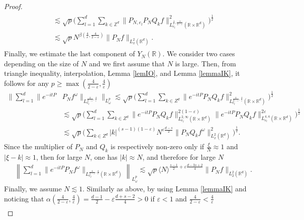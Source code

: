 \documentclass[10pt,leqno]{amsart}
\newcommand{\R}{\mathbb{R}}
\numberwithin{equation}{section}
\newcommand{\Z}{\mathbb{Z}}
\begin{document}
\begin{proof}
\begin{multline*}
\begin{aligned}
 &\lesssim \sqrt{p} \bigg( \sum_{l = 1}^d \sum_{k \in \Z^d} \|P_{N,e_l} P_N Q_k f \|^2_{L^{\frac{4}{\varepsilon},\frac{4}{2-\varepsilon}}_{e_l} (\R\times \R^d)} \bigg)^{\frac{1}{2}} \\
& \lesssim \sqrt{p}N^{\beta (\frac{4}{\varepsilon},\frac{4}{2-\varepsilon})} \|P_N f\|_{L_x^2 (\R^d )}.
\end{aligned}
\end{multline*}
Finally, we estimate the last component of $Y_N (\R)$. We consider two cases depending on the size of $N$ and we first  assume that $N$ is large. Then,
from triangle inequality, interpolation,  Lemma \ref{lemIO}, and Lemma \ref{lemmaIK}, it follows for any $p \geq \max (\frac{4}{2-\varepsilon},\frac{4}{\varepsilon})$
\begin{align*}
\bigg\|\sum_{l=1}^d\|e^{-it P}  &P_N f^\omega \|_{ L^{\frac{4}{2-\varepsilon},\frac{4}{\varepsilon}}_{e_l} } \bigg\|_{L^p_\omega}
\lesssim \sqrt{p} \bigg(\sum_{l=1}^d \sum_{k \in Z^d} \| e^{-it P}  P_N Q_k f \|^2_{L^{\frac{4}{2-\varepsilon},\frac{4}{\varepsilon}}_{e_l} (\R\times \R^d)}\bigg)^{\frac{1}{2}}\\
&\lesssim  \sqrt{p} \bigg(\sum_{l=1}^d \sum_{k \in Z^d} \|e^{-it P}  P_N Q_k f\|_{L^{2,\infty}_{e_l} (\R \times \R^d)}^{2(1-\varepsilon)} \|e^{-it P}  P_N Q_k f\|_{L^{4,4}_{e_l}(\R \times \R^d) }^{2\varepsilon} 
\bigg)^{\frac{1}{2}}\\
&\lesssim\sqrt{p} \bigg( \sum_{k \in Z^d} |k|^{(s-1)(1-\varepsilon)} N^{\varepsilon \frac{d -s}{2} } \|P_N Q_k f^\omega\|^2_{L_x^2 (\R^d)} \bigg)^{\frac{1}{2}}.
\end{align*}
Since the multiplier of $P_N$ and $Q_k$ is respectively non-zero only if $\frac{\xi}{N} \approx 1$ and $|\xi - k| \approx 1$, then for large $N$, one has $|k|\approx N$, and therefore 
for large $N$
\begin{align*}
&\left\|\sum_{l=1}^d \|e^{-it P}  P_N f^\omega \|_{  L^{\frac{4}{2-\varepsilon},\frac{4}{\varepsilon}}_{e_l} (\R\times \R^d)} \right\|_{L_\omega^p}
\lesssim \sqrt{p}\langle N\rangle^{\frac{s-1}{2} + \varepsilon  \frac{d -3s+2}{4}} \|P_N f\|_{L_2^2 (\R^d )}.
\end{align*}
Finally, we assume $N \lesssim 1$. Similarly as above, by using Lemma \ref{lemmaIK} and noticing that $\alpha (\frac{4}{2-\varepsilon},\frac{4}{\varepsilon} )= \frac{d-1}{2}- \varepsilon \frac{d+s -2}{4}>0$ if 
$\varepsilon < 1$ and $\frac{4}{2 - \varepsilon} < \frac{4}{\varepsilon}$
\begin{align*}

\end{align*}
\end{proof}
\end{document}
